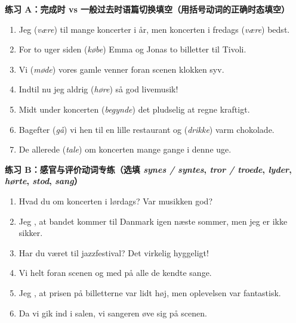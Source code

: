\textbf{练习 A：完成时 vs 一般过去时语篇切换填空（用括号动词的正确时态填空）}
\begin{enumerate}
  \item Jeg \underline{\hspace{2.6cm}} (\textit{være}) til mange koncerter i år, men koncerten i fredags \underline{\hspace{2.0cm}} (\textit{være}) bedst.
  \item For to uger siden \underline{\hspace{2.2cm}} (\textit{købe}) Emma og Jonas to billetter til Tivoli.
  \item Vi \underline{\hspace{2.4cm}} (\textit{møde}) vores gamle venner foran scenen klokken syv.
  \item Indtil nu \underline{\hspace{1.4cm}} jeg aldrig \underline{\hspace{2.2cm}} (\textit{høre}) så god livemusik!
  \item Midt under koncerten \underline{\hspace{2.4cm}} (\textit{begynde}) det pludselig at regne kraftigt.
  \item Bagefter \underline{\hspace{2.2cm}} (\textit{gå}) vi hen til en lille restaurant og \underline{\hspace{2.2cm}} (\textit{drikke}) varm chokolade.
  \item De \underline{\hspace{1.4cm}} allerede \underline{\hspace{2.2cm}} (\textit{tale}) om koncerten mange gange i denne uge.
\end{enumerate}

\textbf{练习 B：感官与评价动词专练（选填 \textit{synes / syntes}, \textit{tror / troede}, \textit{lyder}, \textit{hørte}, \textit{stod}, \textit{sang}）}
\begin{enumerate}
  \item Hvad \underline{\hspace{2.0cm}} du om koncerten i lørdags? Var musikken god?
  \item Jeg \underline{\hspace{2.0cm}}, at bandet kommer til Danmark igen næste sommer, men jeg er ikke sikker.
  \item Har du været til jazzfestival? Det \underline{\hspace{2.0cm}} virkelig hyggeligt!
  \item Vi \underline{\hspace{2.0cm}} helt foran scenen og \underline{\hspace{2.0cm}} med på alle de kendte sange.
  \item Jeg \underline{\hspace{2.0cm}}, at prisen på billetterne var lidt høj, men oplevelsen var fantastisk.
  \item Da vi gik ind i salen, \underline{\hspace{2.0cm}} vi sangeren øve sig på scenen.
\end{enumerate}

